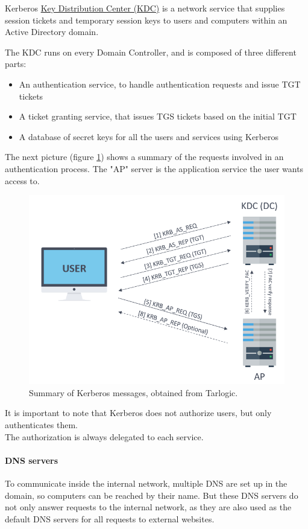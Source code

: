 Kerberos \underline{Key Distribution Center (KDC)} is a network service that supplies session tickets and temporary session keys to users and computers within an Active Directory domain. 

The KDC runs on every Domain Controller, and is composed of three different parts: 
\begin{itemize}
\item An authentication service, to handle authentication requests and issue TGT tickets
\item A ticket granting service, that issues TGS tickets based on the initial TGT
\item A database of secret keys for all the users and services using Kerberos
\end{itemize}

The next picture (figure \ref{img:tgtTgs}) shows a summary of the requests involved in an authentication process. The "AP" server is the application service the user wants access to.

\begin{figure}[!ht]
	\centering
	\includegraphics[width=13cm]{img/kerberos_message}
	\caption{Summary of Kerberos messages, obtained from Tarlogic\cite{Tarlogic}.}
	\label{img:tgtTgs}
\end{figure}

It is important to note that Kerberos does not authorize users, but only authenticates them.\\ The authorization is always delegated to each service.

\paragraph{DNS servers}
To communicate inside the internal network, multiple DNS are set up in the domain, so computers can be reached by their name. But these DNS servers do not only answer requests to the internal network, as they are also used as the default DNS servers for all requests to external websites. 

